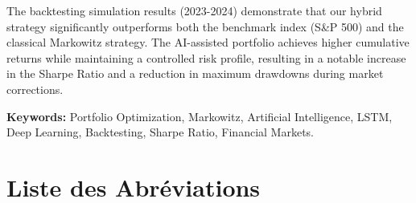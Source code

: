 The backtesting simulation results (2023-2024) demonstrate that our hybrid strategy significantly outperforms both the benchmark index (S\&P 500) and the classical Markowitz strategy. The AI-assisted portfolio achieves higher cumulative returns while maintaining a controlled risk profile, resulting in a notable increase in the Sharpe Ratio and a reduction in maximum drawdowns during market corrections.

\textbf{Keywords:} Portfolio Optimization, Markowitz, Artificial Intelligence, LSTM, Deep Learning, Backtesting, Sharpe Ratio, Financial Markets.

\newpage

\tableofcontents
\newpage
\listoffigures
\newpage
\listoftables
\newpage

\chapter*{Liste des Abréviations}

